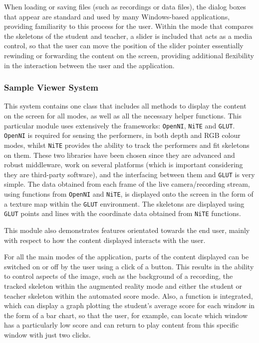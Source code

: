 \documentclass[11pt,a4paper]{article}
\begin{document}
\noindent
When loading or saving files (such as recordings or data files), the dialog boxes that appear are standard and used by many Windows-based applications, providing familiarity to this process for the user.
Within the mode that compares the skeletons of the student and teacher, a slider is included that acts as a media control, so that the user can move the position of the slider pointer essentially rewinding or forwarding the content on the screen, providing additional flexibility in the interaction between the user and the application.

\subsubsection*{Sample Viewer System}

This system contains one class that includes all methods to display the content on the screen for all modes, as well as all the necessary helper functions. This particular module uses extensively the frameworks: \texttt{OpenNI}, \texttt{NiTE} and \texttt{GLUT}. \texttt{OpenNI} is required for sensing the performers, in both depth and RGB colour modes, whilst \texttt{NiTE} provides the ability to track the performers and fit skeletons on them. These two libraries have been chosen since they are advanced and robust middleware, work on several platforms (which is important considering they are third-party software), and the interfacing between them and \texttt{GLUT} is very simple. The data obtained from each frame of the live camera/recording stream, using functions from \texttt{OpenNI} and \texttt{NiTE}, is displayed onto the screen in the form of a texture map within the \texttt{GLUT} environment. The skeletons are displayed using \texttt{GLUT} points and lines with the coordinate data obtained from \texttt{NiTE} functions.

\noindent
This module also demonstrates features orientated towards the end user, mainly with respect to how the content displayed interacts with the user.

\noindent
For all the main modes of the application, parts of the content displayed can be switched on or off by the user using a click of a button. This results in the ability to control aspects of the image, such as the background of a recording, the tracked skeleton within the augmented reality mode and either the student or teacher skeleton within the automated score mode. Also, a function is integrated, which can display a graph plotting the student's average score for each window in the form of a bar chart, so that the user, for example, can locate which window has a particularly low score and can return to play content from this specific window with just two clicks.
\end{document}
